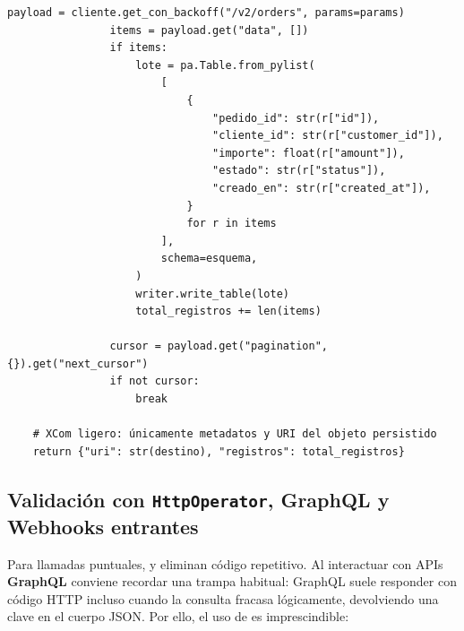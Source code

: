 \begin{lstlisting}[style=python, caption={Extracción paginada (cursor-based) con OAuth2 renovable, control de \texttt{Retry-After} y escritura directa a Parquet.}, label={lst:http-paginacion-oauth2}]
                payload = cliente.get_con_backoff("/v2/orders", params=params)
                items = payload.get("data", [])
                if items:
                    lote = pa.Table.from_pylist(
                        [
                            {
                                "pedido_id": str(r["id"]),
                                "cliente_id": str(r["customer_id"]),
                                "importe": float(r["amount"]),
                                "estado": str(r["status"]),
                                "creado_en": str(r["created_at"]),
                            }
                            for r in items
                        ],
                        schema=esquema,
                    )
                    writer.write_table(lote)
                    total_registros += len(items)

                cursor = payload.get("pagination", {}).get("next_cursor")
                if not cursor:
                    break

    # XCom ligero: únicamente metadatos y URI del objeto persistido
    return {"uri": str(destino), "registros": total_registros}
\end{lstlisting}

\subsection{Validación con \texttt{HttpOperator}, GraphQL y Webhooks entrantes}

Para llamadas puntuales,  y  eliminan código repetitivo. Al interactuar con APIs \textbf{GraphQL} conviene recordar una trampa habitual: GraphQL suele responder con código HTTP  incluso cuando la consulta fracasa lógicamente, devolviendo una clave  en el cuerpo JSON. Por ello, el uso de  es imprescindible:

